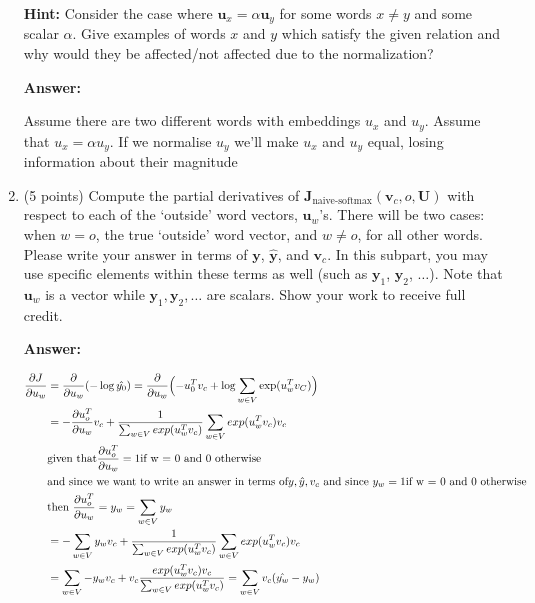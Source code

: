 \documentclass{article}
\newenvironment{answer}{
    {\bf Answer:} \sf \begingroup\color{black}
}{\endgroup}%
\begin{document}
\begin{enumerate}[label=(\alph*)]
\textbf{Hint:} Consider the case where $\mathbf{u}_x = \alpha\mathbf{u}_y$ for some words $x \neq y$ and some scalar $\alpha$. Give examples of words $x$ and $y$ which satisfy the given relation and why would they be affected/not affected due to the normalization?

\begin{shaded}
\begin{answer}

Assume there are two different words with embeddings $u_x$ and $u_y$. Assume that $u_x = \alpha u_y$. If we normalise $u_y$ we'll make $u_x$ and $u_y$ equal, losing information about their magnitude

\end{answer}
\end{shaded}

\item (5 points) Compute the partial derivatives of $\bm J_{\text{naive-softmax}}(\bm v_c, o, \bm U)$ with respect to each of the `outside' word vectors, $\bm u_w$'s. There will be two cases: when $w=o$, the true `outside' word vector, and $w \neq o$, for all other words. Please write your answer in terms of $\bm y$, $\hat{\bm y}$, and $\bm v_c$. In this subpart, you may use specific elements within these terms as well (such as $\bm y_1$, $\bm y_2$, $\dots$). Note that $\bm u_w$ is a vector while $\bm y_1, \bm y_2, \dots$ are scalars. Show your work to receive full credit.

\begin{shaded}
\begin{answer}

\begin{equation}
    \begin{split}
        \frac{\partial J}{\partial u_w}
        &= \frac{\partial}{\partial u_w} (-\log \hat{y_0}) = \frac{\partial}{\partial u_w} \Bigl(  -u_0^T v_c + \log \sum_{w \in V} \exp(u_w^Tv_C) \Bigl) \\
        &= -\frac{\partial u_o^T}{\partial u_w} v_c + \frac{1}{\sum_{w \in V} exp(u_w^Tv_c)} \sum_{w \in V} exp(u_w^Tv_c) v_c \\
        & \text{given that} \frac{\partial u_o^T}{\partial u_w} =  1 \text{if w = 0 and 0 otherwise } \\
        & \text{and since we want to write an answer in terms of}  y, \hat{y}, v_c \ \text{and since} \ y_w =  1 \text{if w = 0 and 0 otherwise} \\
        & \text{then} \ \frac{\partial u_o^T}{\partial u_w} = y_w = \sum_{w \in V} y_w \\
        &= -\sum_{w \in V} y_w v_c + \frac{1}{\sum_{w \in V} exp(u_w^Tv_c)} \sum_{w \in V} exp(u_w^Tv_c) v_c \\
        &= \sum_{w \in V} -y_w v_c + v_c \frac{exp(u_w^Tv_c) v_c}{\sum_{w \in V} exp(u_w^Tv_c)} = \sum_{w \in V} v_c (\hat{y_w} - y_w)
    \end{split}
\end{equation}


\end{answer}
\end{shaded}
\end{enumerate}
\end{document}
